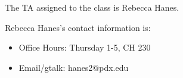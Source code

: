 The TA assigned to the class is Rebecca Hanes. 


Rebecca Hanes's contact information is:
\begin{itemize}
\item Office Hours: Thursday 1-5, CH 230
\item Email/gtalk: hanes2@pdx.edu  
\end{itemize}
